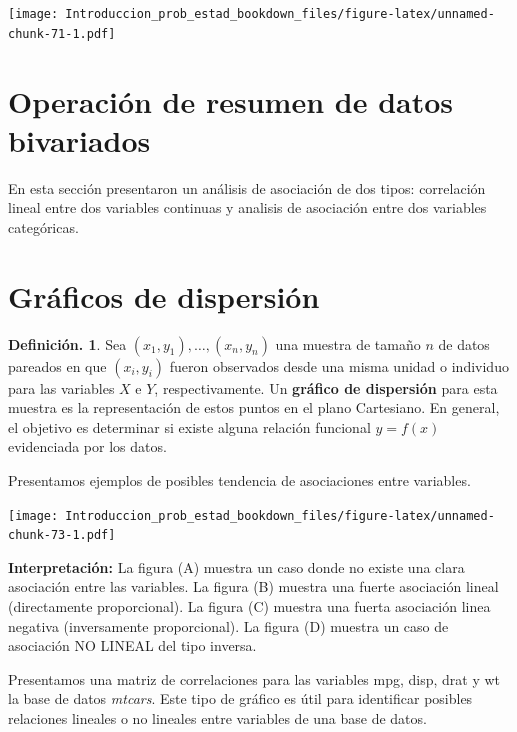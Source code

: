 \documentclass[]{book}
\theoremstyle{definition}
\newtheorem{definition}{Definición.}[chapter]
\theoremstyle{definition}
\theoremstyle{definition}
\theoremstyle{remark}
\begin{document}
\texttt{[image: Introduccion\_prob\_estad\_bookdown\_files/figure-latex/unnamed-chunk-71-1.pdf]}

\hypertarget{operaciuxf3n-de-resumen-de-datos-bivariados}{%
\section{Operación de resumen de datos bivariados}\label{operaciuxf3n-de-resumen-de-datos-bivariados}}

En esta sección presentaron un análisis de asociación de
dos tipos: correlación lineal entre dos variables
continuas y analisis de
asociación entre dos variables categóricas.

\hypertarget{gruxe1ficos-de-dispersiuxf3n}{%
\section{Gráficos de dispersión}\label{gruxe1ficos-de-dispersiuxf3n}}

\begin{definition}
\protect\hypertarget{def:unnamed-chunk-72}{}{\label{def:unnamed-chunk-72} }Sea \((x_1, y_1), \ldots, (x_n, y_n)\) una muestra
de tamaño \(n\) de
datos pareados en que \((x_i,y_i)\) fueron
observados desde una
misma unidad o individuo para las variables \(X\) e
\(Y\),
respectivamente. Un \textbf{gráfico de dispersión} para
esta muestra es
la representación de estos puntos en el plano
Cartesiano. En
general, el objetivo es determinar si existe
alguna relación
funcional \(y=f(x)\) evidenciada por los datos.
\end{definition}

Presentamos ejemplos de posibles tendencia de
asociaciones entre variables.

\texttt{[image: Introduccion\_prob\_estad\_bookdown\_files/figure-latex/unnamed-chunk-73-1.pdf]}

\textbf{Interpretación:} La figura (A) muestra un caso
donde no existe una clara asociación entre las
variables. La figura (B) muestra una fuerte
asociación lineal (directamente proporcional). La
figura (C) muestra una fuerta asociación linea
negativa (inversamente proporcional). La figura
(D) muestra un caso de asociación NO LINEAL del
tipo inversa.

Presentamos una matriz de correlaciones para las
variables mpg,
disp, drat y wt la base de datos \emph{mtcars}. Este
tipo de gráfico es útil para identificar posibles
relaciones lineales o no lineales entre variables
de una base de datos.
\end{document}
